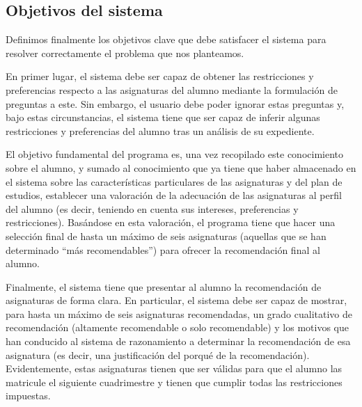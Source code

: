 
\subsection{Objetivos del sistema} \label{sec:objetivos}

Definimos finalmente los objetivos clave que debe satisfacer el sistema para 
resolver correctamente el problema que nos planteamos. 

En primer lugar, el sistema debe ser capaz de obtener las restricciones y 
preferencias respecto a las asignaturas del alumno mediante la formulación de 
preguntas a este. Sin embargo, el usuario debe poder ignorar estas preguntas 
y, bajo estas circunstancias, el sistema tiene que ser capaz de inferir 
algunas restricciones y preferencias del alumno tras un análisis de su 
expediente. 

El objetivo fundamental del programa es, una vez recopilado este conocimiento 
sobre el alumno, y sumado al conocimiento que ya tiene que haber almacenado en 
el sistema sobre las características particulares de las asignaturas y del 
plan de estudios, establecer una valoración de la adecuación de las 
asignaturas al perfil del alumno (es decir, teniendo en cuenta sus intereses, 
preferencias y restricciones). Basándose en esta valoración, el programa 
tiene que hacer una selección final de hasta un máximo de seis asignaturas 
(aquellas que se han determinado ``más recomendables'') para ofrecer la 
recomendación final al alumno.

Finalmente, el sistema tiene que presentar al alumno la recomendación de 
asignaturas de forma clara. En particular, el sistema debe ser capaz de 
mostrar, para hasta un máximo de seis asignaturas recomendadas, un grado 
cualitativo de recomendación (altamente recomendable o solo recomendable) y 
los motivos que han conducido al sistema de razonamiento a determinar la 
recomendación de esa asignatura (es decir, una justificación del porqué de la 
recomendación). Evidentemente, estas asignaturas tienen que ser válidas para 
que el alumno las matricule el siguiente cuadrimestre y tienen que cumplir 
todas las restricciones impuestas.


